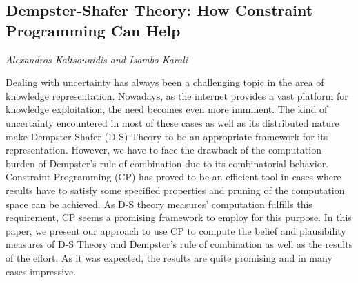 \documentclass[../booklet.tex]{subfiles}
\begin{document}
\subsection[Dempster-Shafer Theory: How Constraint Programming Can Help. {\it Alexandros Kaltsounidis and Isambo Karali}]{Dempster-Shafer Theory: How Constraint Programming Can Help}
 

\begin{center}
  {\it Alexandros Kaltsounidis and Isambo Karali}
\end{center}


Dealing with uncertainty has always been a challenging topic in the area of knowledge representation. Nowadays, as the internet provides a vast platform for knowledge exploitation, the need becomes even more imminent. The kind of uncertainty encountered in most of these cases as well as its distributed nature make Dempster-Shafer (D-S) Theory to be an appropriate framework for its representation. However, we have to face the drawback of the computation burden of Dempster's rule of combination due to its combinatorial behavior. Constraint Programming (CP) has proved to be an efficient tool in cases where results have to satisfy some specified properties and pruning of the computation space can be achieved. As D-S theory measures' computation fulfills this requirement, CP seems a promising framework to employ for this purpose. In this paper, we present our approach to use CP to compute the belief and plausibility measures of D-S Theory and Dempster's rule of combination as well as the results of the effort. As it was expected, the results are quite promising and in many cases impressive.

\end{document}

